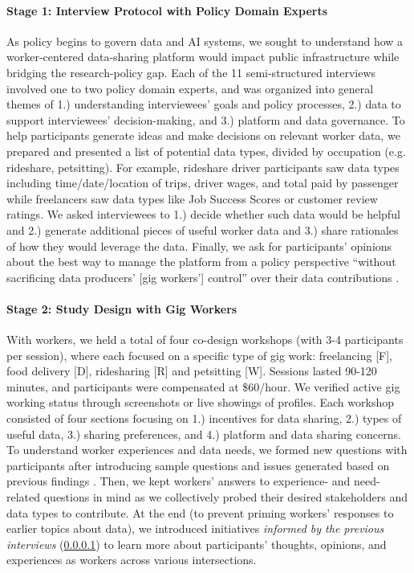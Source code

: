 \paragraph{Stage 1: Interview Protocol with Policy Domain Experts}\label{interviews}
As policy begins to govern data and AI systems, we sought to understand how a worker-centered data-sharing platform would impact public infrastructure while bridging the research-policy gap. Each of the 11 semi-structured interviews involved one to two policy domain experts, and was organized into general themes of 1.) understanding interviewees' goals and policy processes, 2.) data to support interviewees' decision-making, and 3.) platform and data governance. To help participants generate ideas and make decisions on relevant worker data, we prepared and presented a list of potential data types, divided by occupation (e.g. rideshare, petsitting). {For example, rideshare driver participants saw data types including time/date/location of trips, driver wages, and total paid by passenger while freelancers saw data types like Job Success Scores or customer review ratings.} {We asked interviewees} to 1.) decide whether such data would be helpful and 2.) generate additional pieces of useful worker data and 3.) share rationales of how they would leverage the data. Finally, we ask for participants' opinions about the best way to manage the platform from a policy perspective ``without sacrificing data producers' [gig workers'] control'' over their data contributions \cite{GUVs}. 

\paragraph{Stage 2: Study Design with Gig Workers}\label{h.5r3oji4mg7tb}
With workers, we held a total of four co-design workshops (with 3-4 participants per session), where each focused on a specific type of gig work: freelancing [F], food delivery [D], ridesharing [R] and petsitting [W]. 
Sessions lasted 90-120 minutes, and participants were compensated at \$60/hour{. We} verified active gig working status through screenshots or live showings of {profiles}. 
Each workshop consisted of four sections focusing on 1.) incentives for data sharing, 2.) types of {useful data}, 3.) sharing preferences, and 4.) platform and data sharing concerns. 
To understand worker experiences and data needs, we formed new questions with participants {after introducing sample questions and issues generated based on previous findings \cite{codesign,individualized,zhang2022algorithmic}}. 
Then, we kept workers' answers to experience- and need-related questions in mind as we collectively probed {their desired stakeholders and data types to contribute}. 
At the end (to prevent priming workers' responses to earlier topics about data), we introduced initiatives \emph{informed by the previous interviews} (\ref{interviews}) to learn more about {participants'} thoughts, opinions, and experiences as workers across various intersections. 

